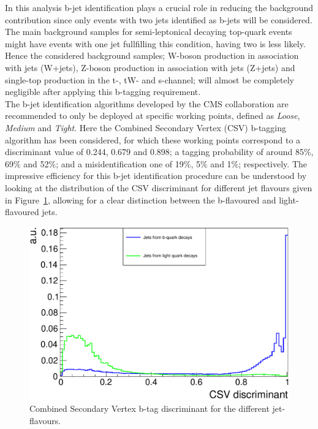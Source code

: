 In this analysis b-jet identification plays a crucial role in reducing the background contribution since only events with two jets identified as b-jets will be considered. The main background samples for semi-leptonical decaying top-quark events might have events with one jet fullfilling this condition, having two  is less likely. %
Hence the considered background samples; W-boson production in association with jets (W+jets), Z-boson production in association with jets (Z+jets) and single-top production in the t-, tW- and s-channel; will almost be completely negligible after applying this b-tagging requirement.
\\

The b-jet identification algorithms developed by the CMS collaboration are recommended to only be deployed at specific working points, defined as \textit{Loose}, \textit{Medium} and \textit{Tight}. 
Here the Combined Secondary Vertex (CSV) b-tagging algorithm has been considered, for which these working points correspond to a discriminant value of 0.244, 0.679 and 0.898; a tagging probability of around 85$\%$, 69$\%$ and 52$\%$; and a misidentification one of 19$\%$, 5$\%$ and 1$\%$; respectively.
The impressive efficiency for this b-jet identification procedure can be understood by looking at the distribution of the CSV discriminant for different jet flavours given in Figure~\ref{fig::CSVDiscr}, allowing for a clear distinction between the b-flavoured and light-flavoured jets.
\begin{figure}[h!t]
 \centering
 \includegraphics[width = 0.75 \textwidth]{Chapters/Chapter4_EvtSel/Figures/CSVDiscr_LightAndBJets.pdf}
 \caption{Combined Secondary Vertex b-tag discriminant for the different jet-flavours.} \label{fig::CSVDiscr}
\end{figure}

